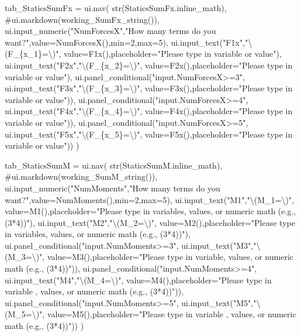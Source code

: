 \documentclass[
  letterpaper,
  DIV=11,
  numbers=noendperiod]{scrreprt}
\newenvironment{Shaded}{\begin{snugshade}}{\end{snugshade}}
\newcommand{\NormalTok}[1]{\textcolor[rgb]{0.00,0.23,0.31}{#1}}
\begin{document}
\begin{Shaded}
\begin{Highlighting}[]
\NormalTok{        tab\_StaticsSumFx = ui.nav(}
\NormalTok{                str(StaticsSumFx.inline\_math),}
\NormalTok{                \#ui.markdown(working\_SumFx\_string()),}
\NormalTok{                ui.input\_numeric("NumForcesX","How many terms do you want?",value=NumForcesX(),min=2,max=5),}
\NormalTok{                ui.input\_text("F1x","\textbackslash{}(F\_\{x\_1\}=\textbackslash{})", value=F1x(),placeholder="Please type in variable or value"),}
\NormalTok{                ui.input\_text("F2x","\textbackslash{}(F\_\{x\_2\}=\textbackslash{})", value=F2x(),placeholder="Please type in variable or value"),}
\NormalTok{                ui.panel\_conditional("input.NumForcesX\textgreater{}=3", ui.input\_text("F3x","\textbackslash{}(F\_\{x\_3\}=\textbackslash{})", value=F3x(),placeholder="Please type in variable or value")),}
\NormalTok{                ui.panel\_conditional("input.NumForcesX\textgreater{}=4", ui.input\_text("F4x","\textbackslash{}(F\_\{x\_4\}=\textbackslash{})", value=F4x(),placeholder="Please type in variable or value")),}
\NormalTok{                ui.panel\_conditional("input.NumForcesX\textgreater{}=5", ui.input\_text("F5x","\textbackslash{}(F\_\{x\_5\}=\textbackslash{})", value=F5x(),placeholder="Please type in variable or value"))}
\NormalTok{                )}
        
\NormalTok{        tab\_StaticsSumM = ui.nav(}
\NormalTok{                str(StaticsSumM.inline\_math),}
\NormalTok{                \#ui.markdown(working\_SumM\_string()),}
\NormalTok{                ui.input\_numeric("NumMoments","How many terms do you want?",value=NumMoments(),min=2,max=5),}
\NormalTok{                ui.input\_text("M1","\textbackslash{}(M\_1=\textbackslash{})", value=M1(),placeholder="Please type in variables, values, or numeric math (e.g., (3*4))"),}
\NormalTok{                ui.input\_text("M2","\textbackslash{}(M\_2=\textbackslash{})", value=M2(),placeholder="Please type in variables, values, or numeric math (e.g., (3*4))"),}
\NormalTok{                ui.panel\_conditional("input.NumMoments\textgreater{}=3", ui.input\_text("M3","\textbackslash{}(M\_3=\textbackslash{})", value=M3(),placeholder="Please type in variable, values, or numeric math (e.g., (3*4))")),}
\NormalTok{                ui.panel\_conditional("input.NumMoments\textgreater{}=4", ui.input\_text("M4","\textbackslash{}(M\_4=\textbackslash{})", value=M4(),placeholder="Please type in variable , values, or numeric math (e.g., (3*4))")),}
\NormalTok{                ui.panel\_conditional("input.NumMoments\textgreater{}=5", ui.input\_text("M5","\textbackslash{}(M\_5=\textbackslash{})", value=M5(),placeholder="Please type in variable , values, or numeric math (e.g., (3*4))"))}
\NormalTok{                )}
        

\end{Highlighting}
\end{Shaded}
\end{document}
